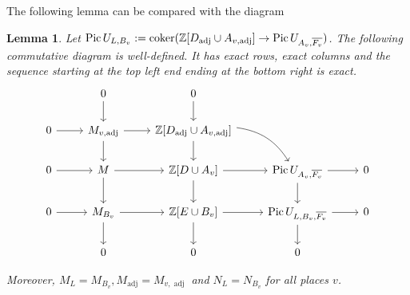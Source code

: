\documentclass[a4paper,11pt,reqno]{amsart}
\DeclareMathOperator{\coker}{coker}
\DeclareMathOperator{\Pic}{Pic}
\DeclareMathOperator{\adj}{adj}
\newtheorem{lemma}[theorem]{Lemma}
\theoremstyle{definition}
\begin{document}
The following lemma can be compared with the diagram \cite[p.~3225]{Batyrev1996Height}
\begin{lemma}\label{lem:Diagram of Iitaka fibration tori}
	Let $\Pic U_{L, B_v} := \coker(\Z[D_{\adj} \cup A_{v, \adj}] \to \Pic U_{A_v, \overline{F_v}})$. The following commutative diagram is well-defined. It has exact rows, exact columns and the sequence starting at the top left end ending at the bottom right is exact.
	\[\begin{tikzcd}
		& 0 & 0 \\
		0 & {M_{v, \adj}} & {\Z[D_{\adj} \cup A_{v, \adj}]} \\
		0 & M & {\Z[D \cup A_v]} & {\Pic U_{A_v, \overline{F_v}}} & 0 \\
		0 & {M_{B_v}} & {\Z[E \cup B_v]} & {\Pic U_{L, B_v, \overline{F_v}}} & 0 \\
		& 0 & 0 & 0
		\arrow[from=1-2, to=2-2]
		\arrow[from=1-3, to=2-3]
		\arrow[from=2-1, to=2-2]
		\arrow[from=2-2, to=2-3]
		\arrow[from=2-2, to=3-2]
		\arrow[from=2-3, to=3-3]
		\arrow[bend left=25, from=2-3, to=3-4]
		\arrow[from=3-1, to=3-2]
		\arrow[from=3-2, to=3-3]
		\arrow[from=3-2, to=4-2]
		\arrow[from=3-3, to=3-4]
		\arrow[from=3-3, to=4-3]
		\arrow[from=3-4, to=3-5]
		\arrow[from=3-4, to=4-4]
		\arrow[from=4-1, to=4-2]
		\arrow[from=4-2, to=4-3]
		\arrow[from=4-2, to=5-2]
		\arrow[from=4-3, to=4-4]
		\arrow[from=4-3, to=5-3]
		\arrow[from=4-4, to=4-5]
		\arrow[from=4-4, to=5-4]
	\end{tikzcd}\]
	
	Moreover, $M_L = M_{B_v}, M_{\adj} = M_{v, \adj}$ and $N_L = N_{B_v}$ for all places $v$.
\end{lemma}
\end{document}

